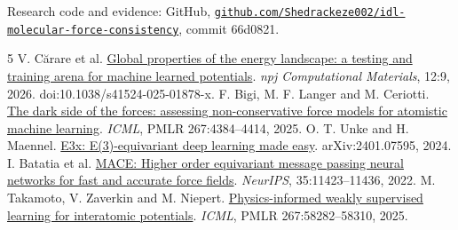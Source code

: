 \documentclass{article}
\begin{document}
{\raggedright Research code and evidence: GitHub, \href{https://github.com/Shedrackeze002/idl-molecular-force-consistency/tree/66d082158100a0c81b9a7815f7ac2a65f155b7ee}{\nolinkurl{github.com/Shedrackeze002/idl-molecular-force-consistency}}, commit 66d0821.\par}
\begin{thebibliography}{5}\small
{} V. C\u{a}rare et al. \href{https://doi.org/10.1038/s41524-025-01878-x}{Global properties of the energy landscape: a testing and training arena for machine learned potentials}. \emph{npj Computational Materials}, 12:9, 2026. doi:10.1038/s41524-025-01878-x.
 F. Bigi, M. F. Langer and M. Ceriotti. \href{https://proceedings.mlr.press/v267/bigi25a.html}{The dark side of the forces: assessing non-conservative force models for atomistic machine learning}. \emph{ICML}, PMLR 267:4384--4414, 2025.
 O. T. Unke and H. Maennel. \href{https://arxiv.org/abs/2401.07595}{E3x: E(3)-equivariant deep learning made easy}. arXiv:2401.07595, 2024.
 I. Batatia et al. \href{https://arxiv.org/abs/2206.07697}{MACE: Higher order equivariant message passing neural networks for fast and accurate force fields}. \emph{NeurIPS}, 35:11423--11436, 2022.
 M. Takamoto, V. Zaverkin and M. Niepert. \href{https://proceedings.mlr.press/v267/takamoto25a.html}{Physics-informed weakly supervised learning for interatomic potentials}. \emph{ICML}, PMLR 267:58282--58310, 2025.
\end{thebibliography}
\end{document}
